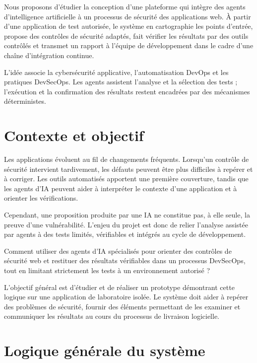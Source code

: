 \documentclass[11pt,a4paper]{article}
\begin{document}
\begin{summarybox}
Nous proposons d'étudier la conception d'une plateforme qui intègre des agents d'intelligence artificielle à un processus de sécurité des applications web. À partir d'une application de test autorisée, le système en cartographie les points d'entrée, propose des contrôles de sécurité adaptés, fait vérifier les résultats par des outils contrôlés et transmet un rapport à l'équipe de développement dans le cadre d'une chaîne d'intégration continue.

L'idée associe la cybersécurité applicative, l'automatisation DevOps et les pratiques DevSecOps. Les agents assistent l'analyse et la sélection des tests ; l'exécution et la confirmation des résultats restent encadrées par des mécanismes déterministes.
\end{summarybox}

\section{Contexte et objectif}

Les applications évoluent au fil de changements fréquents. Lorsqu'un contrôle de sécurité intervient tardivement, les défauts peuvent être plus difficiles à repérer et à corriger. Les outils automatisés apportent une première couverture, tandis que les agents d'IA peuvent aider à interpréter le contexte d'une application et à orienter les vérifications.

Cependant, une proposition produite par une IA ne constitue pas, à elle seule, la preuve d'une vulnérabilité. L'enjeu du projet est donc de relier l'analyse assistée par agents à des tests limités, vérifiables et intégrés au cycle de développement.

\begin{questionbox}
Comment utiliser des agents d'IA spécialisés pour orienter des contrôles de sécurité web et restituer des résultats vérifiables dans un processus DevSecOps, tout en limitant strictement les tests à un environnement autorisé ?
\end{questionbox}

L'objectif général est d'étudier et de réaliser un prototype démontrant cette logique sur une application de laboratoire isolée. Le système doit aider à repérer des problèmes de sécurité, fournir des éléments permettant de les examiner et communiquer les résultats au cours du processus de livraison logicielle.

\section{Logique générale du système}
\end{document}
